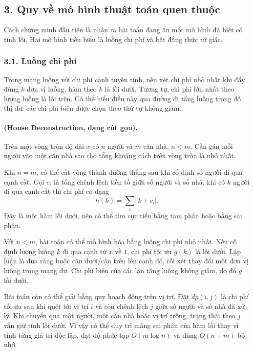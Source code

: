 \documentclass[11pt]{article}
\begin{document}
\subsection*{3. Quy về mô hình thuật toán quen thuộc}

Cách chứng minh đầu tiên là nhận ra bài toán đang ẩn một mô hình đã biết có
tính lồi. Hai mô hình tiêu biểu là luồng chi phí và bất đẳng thức tứ giác.

\subsubsection*{3.1. Luồng chi phí}

Trong mạng luồng với chi phí cạnh tuyến tính, nếu xét chi phí nhỏ nhất khi
đẩy đúng $k$ đơn vị luồng, hàm theo $k$ là lồi dưới. Tương tự, chi phí lớn
nhất theo lượng luồng là lồi trên. Có thể hiểu điều này qua đường đi tăng
luồng trong đồ thị dư: các chi phí biên được chọn theo thứ tự không giảm.

\paragraph{ (House Deconstruction, dạng rút gọn).}
Trên một vòng tròn độ dài $x$ có $n$ người và $m$ căn nhà, $n<m$. Cần gán mỗi
người vào một căn nhà sao cho tổng khoảng cách trên vòng tròn là nhỏ nhất.

Khi $n=m$, có thể cắt vòng thành đường thẳng sau khi cố định số người đi qua
cạnh cắt. Gọi $c_i$ là tổng chênh lệch tiền tố giữa số người và số nhà, khi
có $k$ người đi qua cạnh cắt thì chi phí có dạng
\[
  h(k)=\sum_i |k+c_i|.
\]
Đây là một hàm lồi dưới, nên có thể tìm cực tiểu bằng tam phân hoặc bằng sai
phân.

Với $n<m$, bài toán có thể mô hình hóa bằng luồng chi phí nhỏ nhất. Nếu cố định
lượng luồng $k$ đi qua cạnh từ $x$ về $1$, chi phí tối ưu $g(k)$ là lồi dưới.
Lập luận là đưa ràng buộc cận dưới/cận trên lên cạnh đó, rồi xét thay đổi một
đơn vị luồng trong mạng dư. Chi phí biên của các lần tăng luồng không giảm, do
đó $g$ lồi dưới.

Bài toán còn có thể giải bằng quy hoạch động trên vị trí. Đặt $dp(i,j)$ là chi
phí tối ưu sau khi quét tới vị trí $i$ và còn chênh lệch $j$ giữa số người và
số nhà đã xử lý. Khi chuyển qua một người, một căn nhà hoặc vị trí trống,
trạng thái theo $j$ vẫn giữ tính lồi dưới. Vì vậy có thể duy trì mảng sai phân
của hàm lồi thay vì tính từng giá trị độc lập, đạt độ phức tạp
$O(m\log n)$ và dùng $O(n+m)$ bộ nhớ.
\end{document}
